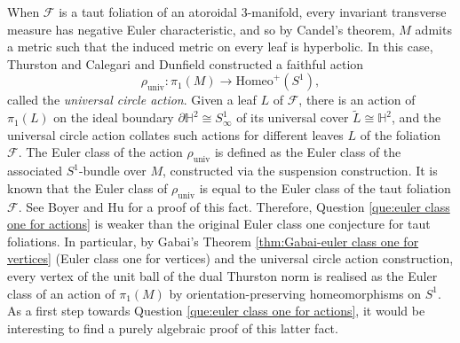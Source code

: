 \documentclass[11pt]{amsart}
\theoremstyle{remark}
\theoremstyle{definition}
\begin{document}
	When $\mathcal{F}$ is a taut foliation of an atoroidal 3-manifold, every invariant transverse measure has negative Euler characteristic, and so by Candel's theorem, $M$ admits a metric such that the induced metric on every leaf is hyperbolic. In this case, Thurston \cite{thurston1998three} and Calegari and Dunfield \cite{calegari2003laminations} constructed a faithful action 
	\[ \rho_{\mathrm{univ}} \colon \pi_1(M) \rightarrow \mathrm{Homeo}^+(S^1), \]
	called the \emph{universal circle action}. Given a leaf $L$ of $\mathcal{F}$, there is an action of $\pi_1(L)$ on the ideal boundary $\partial \mathbb{H}^2 \cong S^1_\infty$ of its universal cover $\tilde{L} \cong \mathbb{H}^2$, and the universal circle action collates such actions for different leaves $L$ of the foliation $\mathcal{F}$. The Euler class of the action $\rho_\mathrm{univ}$ is defined as the Euler class of the associated $S^1$-bundle over $M$, constructed via the suspension construction. It is known that the Euler class of $\rho_\mathrm{univ}$ is equal to the Euler class of the taut foliation $\mathcal{F}$. See Boyer and Hu \cite{boyer2019taut} for a proof of this fact. Therefore, Question \ref{que:euler class one for actions} is weaker than the original Euler class one conjecture for taut foliations. In particular, by Gabai's Theorem \ref{thm:Gabai-euler class one for vertices} (Euler class one for vertices) and the universal circle action construction, every vertex of the unit ball of the dual Thurston norm is realised as the Euler class of an action of $\pi_1(M)$ by orientation-preserving homeomorphisms on $S^1$. As a first step towards Question \ref{que:euler class one for actions}, it would be interesting to find a purely algebraic proof of this latter fact.
	
\end{document}
